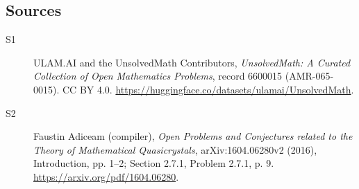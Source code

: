 \documentclass[11pt]{article}
\begin{document}
\subsection{Sources}
\begin{description}
\item[\hypertarget{source:6600015:1}{S1}] ULAM.AI and the UnsolvedMath Contributors, \emph{UnsolvedMath: A Curated Collection of Open Mathematics Problems}, record 6600015 (AMR-065-0015). CC BY 4.0. \url{https://huggingface.co/datasets/ulamai/UnsolvedMath}.
\item[\hypertarget{source:6600015:2}{S2}] Faustin Adiceam (compiler), \emph{Open Problems and Conjectures related to the Theory of Mathematical Quasicrystals}, arXiv:1604.06280v2 (2016), Introduction, pp. 1--2; Section 2.7.1, Problem 2.7.1, p. 9. \url{https://arxiv.org/pdf/1604.06280}.
\end{description}
\label{end:6600015}
\end{document}
